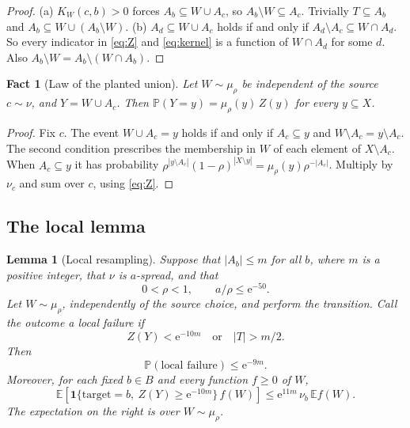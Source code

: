 \documentclass[11pt]{article}
\newtheorem{lemma}[theorem]{Lemma}
\newtheorem{fact}{Fact}
\numberwithin{equation}{section}
\newcommand{\PP}{\mathbb P}
\newcommand{\EE}{\mathbb E}
\newcommand{\ind}{\mathbf 1}
\newcommand{\ee}{\mathrm e}
\begin{document}
\begin{proof}
(a) $K_W(c,b)>0$ forces $A_b\subseteq W\cup A_c$, so
$A_b\setminus W\subseteq A_c$. Trivially $T\subseteq A_b$ and
$A_b\subseteq W\cup(A_b\setminus W)$.
(b) $A_d\subseteq W\cup A_c$ holds if and only if
$A_d\setminus A_c\subseteq W\cap A_d$. So every indicator in
\eqref{eq:Z} and \eqref{eq:kernel} is a function of $W\cap A_d$ for
some $d$. Also $A_b\setminus W=A_b\setminus(W\cap A_b)$.
\end{proof}

\begin{fact}[Law of the planted union]\label{fact:B}
Let $W\sim\mu_\rho$ be independent of the source $c\sim\nu$, and
$Y=W\cup A_c$. Then $\PP(Y=y)=\mu_\rho(y)\,Z(y)$ for every
$y\subseteq X$.
\end{fact}

\begin{proof}
Fix $c$. The event $W\cup A_c=y$ holds if and only if $A_c\subseteq y$
and $W\setminus A_c=y\setminus A_c$. The second condition prescribes
the membership in $W$ of each element of $X\setminus A_c$. When
$A_c\subseteq y$ it has probability
$\rho^{|y\setminus A_c|}(1-\rho)^{|X\setminus y|}
=\mu_\rho(y)\rho^{-|A_c|}$. Multiply by $\nu_c$ and sum over $c$,
using \eqref{eq:Z}.
\end{proof}

\subsection{The local lemma}

\begin{lemma}[Local resampling]\label{lem:local}
Suppose that $|A_b|\le m$ for all $b$, where $m$ is a positive integer,
that $\nu$ is $a$-spread, and that
\[
 0<\rho<1,\qquad a/\rho\le\ee^{-50}.
\]
Let $W\sim\mu_\rho$, independently of the source choice, and perform
the transition. Call the outcome a \emph{local failure} if
\[
 Z(Y)<\ee^{-10m}\quad\text{or}\quad |T|>m/2.
\]
Then
\begin{equation}\label{eq:local-failure}
 \PP(\text{local failure})\le\ee^{-9m}.
\end{equation}
Moreover, for each fixed $b\in B$ and every function $f\ge0$ of $W$,
\begin{equation}\label{eq:distortion}
 \EE\!\left[
  \ind\{\mathrm{target}=b,\ Z(Y)\ge\ee^{-10m}\}\, f(W)
 \right]
 \le \ee^{11m}\,\nu_b\,\EE f(W).
\end{equation}
The expectation on the right is over $W\sim\mu_\rho$.
\end{lemma}
\end{document}
